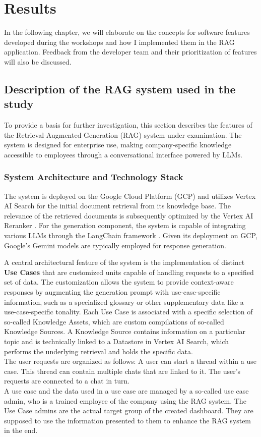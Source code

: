 \documentclass[
	english,
	ruledheaders=section,%
	class=report,%
	thesis={type=bachelor},%
	accentcolor=1b,%
	custommargins=true,%
	marginpar=false,%
	parskip=half-,%
	fontsize=11pt,%
	DIV=14,
]{tudapub}
\begin{document}
\chapter{Results}
In the following chapter, we will elaborate on the concepts for software features developed during the workshops and how I implemented them in the RAG application. Feedback from the developer team and their prioritization of features will also be discussed.
\section{Description of the RAG system used in the study}
To provide a basis for further investigation, this section describes the features of the Retrieval-Augmented Generation (RAG) system under examination. The system is designed for enterprise use, making company-specific knowledge accessible to employees through a conversational interface powered by LLMs.

\subsection{System Architecture and Technology Stack}
The system is deployed on the Google Cloud Platform (GCP) \parencite{GoogleCloudDocumentation} and utilizes Vertex AI Search \parencite{GoogleVertexAISearch} for the initial document retrieval from its knowledge base. The relevance of the retrieved documents is subsequently optimized by the Vertex AI Reranker \parencite{GoogleReranker}. For the generation component, the system is capable of integrating various LLMs through the LangChain framework \parencite{LangChain}. Given its deployment on GCP, Google's Gemini models \parencite{GoogleGemini} are typically employed for response generation.

A central architectural feature of the system is the implementation of distinct \textbf{Use Cases} that are customized units capable of handling requests to a specified set of data. The customization allows the system to provide context-aware responses by augmenting the generation prompt with use-case-specific information, such as a specialized glossary or other supplementary data like a use-case-specific tonality. Each Use Case is associated with a specific selection of so-called Knowledge Assets, which are custom compilations of so-called Knowledge Sources. A Knowledge Source contains information on a particular topic and is technically linked to a Datastore in Vertex AI Search, which performs the underlying retrieval and holds the specific data.\\
The user requests are organized as follows: A user can start a thread within a use case. This thread can contain multiple chats that are linked to it. The user's requests are connected to a chat in turn.\\
A use case and the data used in a use case are managed by a so-called use case admin, who is a trained employee of the company using the RAG system. The Use Case admins are the actual target group of the created dashboard. They are supposed to use the information presented to them to enhance the RAG system in the end.
\end{document}
